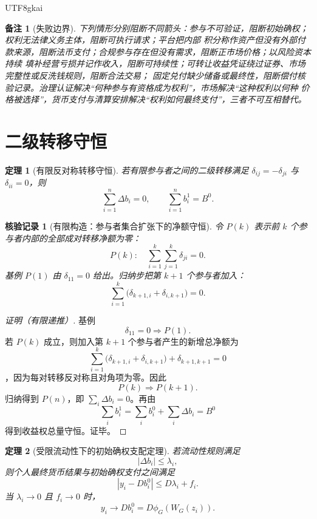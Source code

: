 \documentclass[12pt,a4paper,openany]{report}
\newtheorem{theorem}{定理}[chapter]
\newtheorem{remark}{备注}[chapter]
\newtheorem{Certificate}{核验记录}[chapter]
\newcommand{\Abs}[1]{\left\lvert #1\right\rvert}
\begin{document}
\begin{CJK*}{UTF8}{gkai}
\begin{remark}[失败边界]
下列情形分别阻断不同箭头：参与不可验证，阻断初始确权；权利无法律义务主体，阻断可执行请求；平台把内部
积分称作资产但没有外部付款来源，阻断法币支付；合规参与存在但没有需求，阻断正市场价格；以风险资本持续
填补经营亏损并记作收入，阻断可持续性；可转让收益凭证绕过证券、市场完整性或反洗钱规则，阻断合法交易；
固定兑付缺少储备或最终性，阻断偿付核验记录。治理认证解决“何种参与有资格成为权利”，市场解决“这种权利以何种
价格被选择”，货币支付与清算安排解决“权利如何最终支付”，三者不可互相替代。
\end{remark}

\section{二级转移守恒}

\begin{theorem}[有限反对称转移守恒]
\label{thm:secondary-transfer-conservation}
若有限参与者之间的二级转移满足 \(\delta_{ij}=-\delta_{ji}\) 与 \(\delta_{ii}=0\)，则
\[
  \sum_{i=1}^n\Delta b_i=0,
\qquad
  \sum_{i=1}^n b_i^1=B^0.
\]
\end{theorem}

\begin{Certificate}[有限构造：参与者集合扩张下的净额守恒]
\label{cert:secondary-transfer-conservation}
令 \(P(k)\) 表示前 \(k\) 个参与者内部的全部成对转移净额为零：
\[
  P(k):\quad
  \sum_{i=1}^{k}\sum_{j=1}^{k}\delta_{ji}=0.
\]
基例 \(P(1)\) 由 \(\delta_{11}=0\) 给出。归纳步把第 \(k+1\) 个参与者加入：
\[
  \sum_{i=1}^{k}\bigl(\delta_{k+1,i}+\delta_{i,k+1}\bigr)=0.
\]
\end{Certificate}

\begin{proof}[证明（有限递推）]
基例
\[
  \delta_{11}=0\Longrightarrow P(1).
\]
若 \(P(k)\) 成立，则加入第 \(k+1\) 个参与者产生的新增总净额为
\[
  \sum_{i=1}^{k}
  \bigl(\delta_{k+1,i}+\delta_{i,k+1}\bigr)
  +\delta_{k+1,k+1}=0
\]
，因为每对转移反对称且对角项为零。因此
\[
  P(k)\Longrightarrow P(k+1).
\]
归纳得到 \(P(n)\)，即 \(\sum_i\Delta b_i=0\)。再由
\[
  \sum_i b_i^1
  =
  \sum_i b_i^0+\sum_i\Delta b_i
  =B^0
\]
得到收益权总量守恒。证毕。
\end{proof}

\begin{theorem}[受限流动性下的初始确权支配定理]
\label{thm:limited-liquidity-primary-dominance}
若流动性规则满足
\[
  \Abs{\Delta b_i}\le\lambda_i,
\]
则个人最终货币结果与初始确权支付之间满足
\[
  \Abs{y_i-Db_i^0}
  \le D\lambda_i+f_i.
\]
当 \(\lambda_i\to0\) 且 \(f_i\to0\) 时，
\[
  y_i\to Db_i^0=D\phi_G(W_G(z_i)).
\]
\end{theorem}


\end{CJK*}
\end{document}
